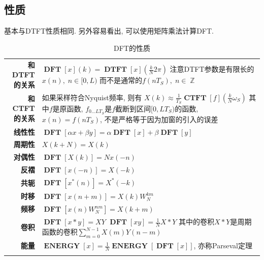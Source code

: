 \documentclass{ctexart}
\DeclareMathOperator{\CTFT}{\mathbf{CTFT}}
\DeclareMathOperator{\DTFT}{\mathbf{DTFT}}
\DeclareMathOperator{\DFT}{\mathbf{DFT}}
\DeclareMathOperator{\ENERGY}{\mathbf{ENERGY}}
\DeclareMathOperator{\Zset}{\mathbb{Z}}
\newlength{\Oldarrayrulewidth}
\newcommand{\Hline}[1]{
  \noalign{\global\setlength{\Oldarrayrulewidth}{\arrayrulewidth}}
  \noalign{\global\setlength{\arrayrulewidth}{#1}}\hline
  \noalign{\global\setlength{\arrayrulewidth}{\Oldarrayrulewidth}}}
\newcommand{\Topline}{\Hline{0.08em}}
\newcommand{\Bottomline}{\Hline{0.08em}}
\begin{document}
\subsection{性质}
    基本与DTFT性质相同. 另外容易看出, 可以使用矩阵乘法计算DFT.\par
    \begin{table}[ht!]
    \begin{tabularx}{\textwidth}{|>{\bfseries}r  L|}
        \Topline
        和DTFT的关系 &  $\DFT[x](k) = \DTFT[x](\frac{k}{N} 2\pi)$\newline
                        注意DTFT参数是有限长的$x(n),\;n\in[0, L)$\newline
                        而不是通常的$f(nT_S),\;n\in\Zset$ \\
        和CTFT的关系 &  如果采样符合Nyquist频率, 则有\newline
                        $X(k) \approx \frac{1}{T_S} \CTFT[f] (\frac{k}{N} \omega_S)$ \newline
                        其中$f$是原函数, $f_{0\ldots LT_S}$是$f$截断到区间$[0, LT_S)$的函数, 
                        $x(n) = f(nT_S)$, 不是严格等于因为加窗的引入的误差  \\
        线性性 &  $\displaystyle \DFT[\alpha x + \beta y] = \alpha \DFT[x] + \beta \DFT[y]$    \\
        周期性 &  $\displaystyle X(k + N) = X(k)$    \\
        对偶性 &  $\displaystyle \DFT[X(k)] = N x(-n)$    \\
        反褶 &  $\displaystyle \DFT[x(-n)] = X(-k)$    \\
        共轭 &  $\displaystyle \DFT[x^*(n)] = X^*(-k)$    \\
        时移 &  $\displaystyle \DFT[x(n + m)] = X(k) W_N^{km}$    \\
        频移 &  $\displaystyle \DFT[x(n) W_N^{nm}] = X(k + m)$    \\
        卷积 &  $\displaystyle \DFT[x * y] = X Y$\newline
                $\DFT[x y] = \frac{1}{N} X * Y$\newline
                其中的卷积$X * Y$是周期函数的卷积$\sum_{m = 0}^{N-1} X(m) Y(n-m)$   \\
        能量 &  $\displaystyle \ENERGY[x] = \frac{1}{N} \ENERGY[\DFT[x]]$, 亦称Parseval定理\\
        \Bottomline
    \end{tabularx}
    \caption{DFT的性质}
    \end{table}
\end{document}
